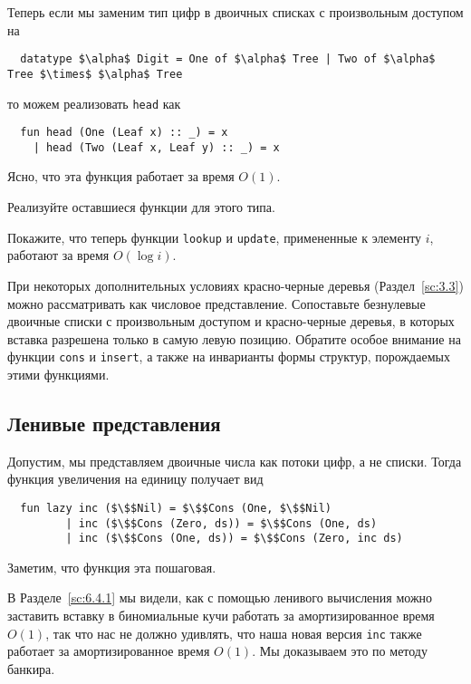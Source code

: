 Теперь если мы заменим тип цифр в двоичных списках с произвольным
доступом на
\begin{lstlisting}
  datatype $\alpha$ Digit = One of $\alpha$ Tree | Two of $\alpha$ Tree $\times$ $\alpha$ Tree
\end{lstlisting}
то можем реализовать \lstinline!head! как
\begin{lstlisting}
  fun head (One (Leaf x) :: _) = x
    | head (Two (Leaf x, Leaf y) :: _) = x
\end{lstlisting}
Ясно, что эта функция работает за время $O(1)$.

\begin{exercise}\label{ex:9.5}
  Реализуйте оставшиеся функции для этого типа.
\end{exercise}

\begin{exercise}\label{ex:9.6}
  Покажите, что теперь функции \lstinline!lookup! и
  \lstinline!update!, примененные к элементу $i$, работают за время
  $O(\log i)$.
\end{exercise}

\begin{exercise}\label{ex:9.7}
  При некоторых дополнительных условиях красно-черные деревья
  (Раздел~\ref{sc:3.3}) можно рассматривать как числовое
  представление. Сопоставьте безнулевые двоичные списки с произвольным
  доступом и красно-черные деревья, в которых вставка разрешена только
  в самую левую позицию. Обратите особое внимание на функции
  \lstinline!cons! и \lstinline!insert!, а также на инварианты формы
  структур, порождаемых этими функциями.
\end{exercise}

\subsection{Ленивые представления}
\label{sc:9.2.3}

Допустим, мы представляем двоичные числа как потоки цифр, а не
списки. Тогда функция увеличения на единицу получает вид
\begin{lstlisting}
  fun lazy inc ($\$$Nil) = $\$$Cons (One, $\$$Nil)
         | inc ($\$$Cons (Zero, ds)) = $\$$Cons (One, ds)
         | inc ($\$$Cons (One, ds)) = $\$$Cons (Zero, inc ds)
\end{lstlisting}
Заметим, что функция эта пошаговая.

В Разделе~\ref{sc:6.4.1} мы видели, как с помощью ленивого вычисления
можно заставить вставку в биномиальные кучи работать за
амортизированное время $O(1)$, так что нас не должно удивлять, что
наша новая версия \lstinline!inc! также работает за амортизированное
время $O(1)$. Мы доказываем это по методу банкира.

